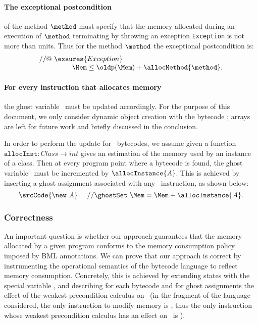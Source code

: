 \paragraph{The exceptional postcondition} of the method $\method$ must
specify that the memory allocated during an execution of $\method$ 
terminating by throwing an exception \texttt{Exception} is not more
than \allocMethod{\method} units. Thus for the method $\method$ the
exceptional postcondition is:
$$
\begin{array}{l}
//@ \ \exsures{Exception} \\
\ \ \ \ \ \ \ \ \ \ \ \ \ \  \Mem \leq \oldp(\Mem) + \allocMethod{\method}.
\end{array}
$$




\paragraph{For every instruction that allocates memory} the ghost
variable \Mem\ must be updated accordingly. For the purpose of
this document, we only consider dynamic object creation with the 
bytecode \new; arrays are left for future work and briefly discussed 
in the conclusion. 

In order to perform the update for \new\ bytecodes, we assume given a
function $\texttt{allocInst}: Class \rightarrow int$ gives an
estimation of the memory used by an instance of a class. Then at every
program point where a bytecode  is found, the ghost
variable \Mem\ must be incremented by $\allocInstance{A}$. This is
achieved by inserting a ghost assignment associated with any \new\
instruction, as shown below:
$$
\srcCode{\new \ A} \ \ \ \ // \ghostSet \ \Mem = \Mem + \allocInstance{A}.
$$

\subsubsection{Correctness} An important question is whether our approach
guarantees that the memory allocated by a given program conforms to
the memory consumption policy imposed by BML annotations. We can
prove that our approach is correct by instrumenting the operational
semantics of the bytecode language to reflect memory
consumption. Concretely, this is achieved by extending states with the
special variable \Mem, and describing for each bytecode and for ghost
assignments the effect of the weakest precondition calculus on \Mem\
(in the fragment of the language considered, the only instruction to
modify memory is \new, thus the only instruction whose weakest
precondition calculus has an effect on \Mem\ is \new).

